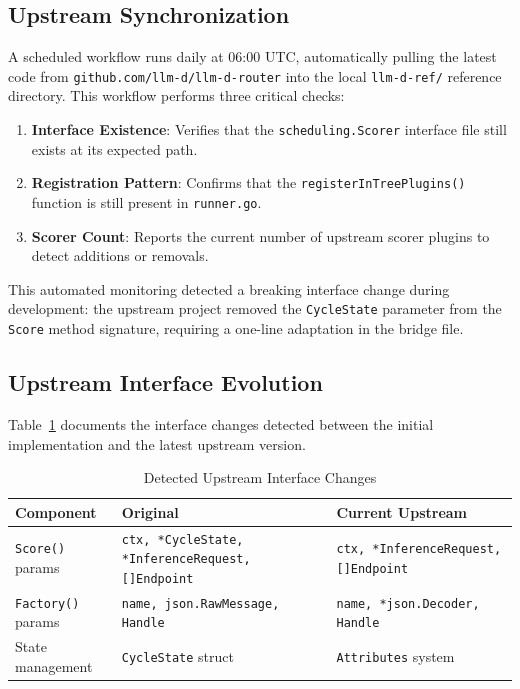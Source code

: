 \subsection{Upstream Synchronization}
\label{subsec:upstream-sync}

A scheduled workflow runs daily at 06:00 UTC, automatically pulling the latest code from \texttt{github.com/llm-d/llm-d-router} into the local \texttt{llm-d-ref/} reference directory. This workflow performs three critical checks:

\begin{enumerate}
    \item \textbf{Interface Existence}: Verifies that the \texttt{scheduling.Scorer} interface file still exists at its expected path.
    \item \textbf{Registration Pattern}: Confirms that the \texttt{registerInTreePlugins()} function is still present in \texttt{runner.go}.
    \item \textbf{Scorer Count}: Reports the current number of upstream scorer plugins to detect additions or removals.
\end{enumerate}

This automated monitoring detected a breaking interface change during development: the upstream project removed the \texttt{CycleState} parameter from the \texttt{Score} method signature, requiring a one-line adaptation in the bridge file.

\subsection{Upstream Interface Evolution}
\label{subsec:interface-evolution}

Table~\ref{tab:interface-changes} documents the interface changes detected between the initial implementation and the latest upstream version.

\begin{table}[htbp]
\centering
\caption{Detected Upstream Interface Changes}
\label{tab:interface-changes}
\begin{tabular}{lp{4cm}p{4cm}}
\toprule
\textbf{Component} & \textbf{Original} & \textbf{Current Upstream} \\
\midrule
\texttt{Score()} params & \texttt{ctx, *CycleState, *InferenceRequest, []Endpoint} & \texttt{ctx, *InferenceRequest, []Endpoint} \\
\texttt{Factory()} params & \texttt{name, json.RawMessage, Handle} & \texttt{name, *json.Decoder, Handle} \\
State management & \texttt{CycleState} struct & \texttt{Attributes} system \\
\bottomrule
\end{tabular}
\end{table}

